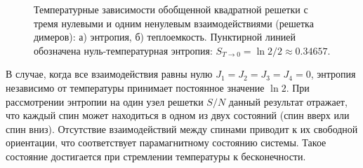 \documentclass[utf8,12pt]{jetp}
\begin{document}
\begin{figure}[h]
	\begin{minipage}[h]{0.5\linewidth}
	\end{minipage}
	\hfill
	\begin{minipage}[h]{0.5\linewidth}
	\end{minipage}
	\caption{Температурные зависимости обобщенной квадратной решетки с тремя нулевыми и одним ненулевым взаимодействиями (решетка димеров): а) энтропия, б) теплоемкость. Пунктирной линией обозначена нуль-температурная энтропия: $S_{T\rightarrow 0} = \ln 2/2\approx 0.34657$.}
	\label{Dimers}
\end{figure}

В случае, когда все взаимодействия равны нулю $J_1 = J_2 = J_3 = J_4 = 0$, энтропия независимо от температуры принимает постоянное значение $\ln 2$. При рассмотрении энтропии на один узел решетки $S/N$ данный результат отражает, что каждый спин может находиться в одном из двух состояний (спин вверх или спин вниз). Отсутствие взаимодействий между спинами приводит к их свободной ориентации, что соответствует парамагнитному состоянию системы. Такое состояние достигается при стремлении температуры к бесконечности.
\end{document}
